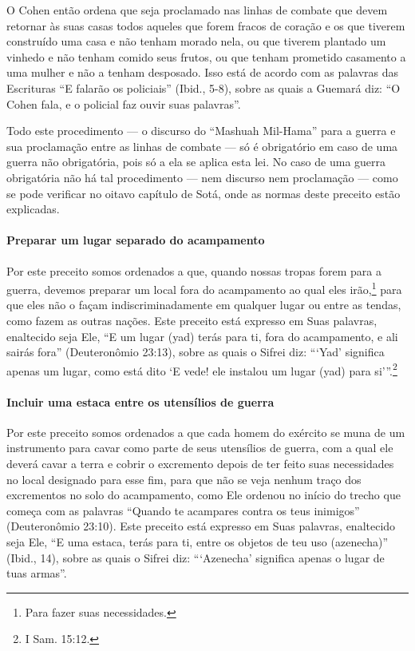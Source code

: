 O Cohen então ordena que seja proclamado nas linhas de combate que
devem retornar às suas casas todos aqueles que forem fracos de coração e
os que tiverem construído uma casa e não tenham morado nela, ou que
tiverem plantado um vinhedo e não tenham comido seus frutos, ou que
tenham prometido casamento a uma mulher e não a tenham desposado. Isso
está de acordo com as palavras das Escrituras ``E falarão os policiais''
(Ibid., 5-8), sobre as quais a Guemará diz: ``O Cohen fala, e o
policial faz ouvir suas palavras''.

Todo este procedimento --- o discurso do ``Mashuah Mil-Hama'' para a
guerra e sua proclamação entre as linhas de combate --- só é obrigatório
em caso de uma guerra não obrigatória, pois só a ela se aplica esta lei.
No caso de uma guerra obrigatória não há tal procedimento --- nem
discurso nem proclamação --- como se pode verificar no oitavo capítulo
de Sotá, onde as normas deste preceito estão explicadas.

\paragraph{Preparar um lugar separado do acampamento}

Por este preceito somos ordenados a que, quando nossas tropas forem para a guerra, devemos preparar um local fora do acampamento ao qual
eles irão,\footnote{Para fazer suas necessidades.} para que eles não o façam
indiscriminadamente em qualquer lugar ou entre as tendas, como fazem as outras nações. Este preceito está expresso em Suas palavras, enaltecido seja Ele, ``E um lugar (yad) terás para ti, fora
do acampamento, e ali sairás fora'' (Deuteronômio 23:13), sobre as quais
o Sifrei diz: ```Yad' significa apenas um lugar, como está dito `E vede!
ele instalou um lugar (yad) para si'''.\footnote{I Sam. 15:12.}

\paragraph{Incluir uma estaca entre os utensílios de guerra}

Por este preceito somos ordenados a que cada homem do exército se muna
de um instrumento para cavar como parte de seus utensílios de guerra,
com a qual ele deverá cavar a terra e cobrir o excremento depois de ter
feito suas necessidades no local designado para esse fim, para que não
se veja nenhum traço dos excrementos no solo do acampamento, como Ele
ordenou no início do trecho que começa com as palavras ``Quando te
acampares contra os teus inimigos'' (Deuteronômio 23:10). Este preceito está expresso em
Suas palavras, enaltecido seja Ele, ``E uma estaca, terás para ti, entre
os objetos de teu uso (azenecha)'' (Ibid., 14), sobre as quais o Sifrei
diz: ```Azenecha' significa apenas o lugar de tuas armas''.

